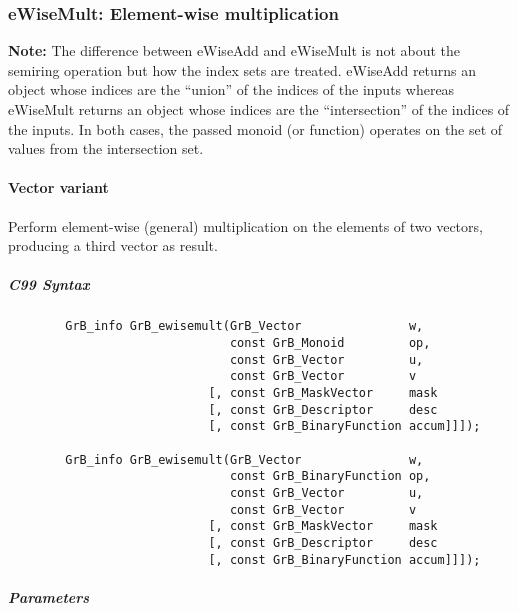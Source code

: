 \subsubsection{{\sf eWiseMult}: Element-wise multiplication}

{\bf Note:} The difference between {\sf eWiseAdd} and {\sf eWiseMult} is not 
about the semiring operation but how the index sets are treated.
{\sf eWiseAdd} returns an object whose indices are the ``union'' of the 
indices of the inputs whereas {\sf eWiseMult} returns an object whose indices 
are the ``intersection'' of the indices of the inputs. In both cases, the 
passed monoid (or function) operates on the set of values from the 
intersection set. 
 
\paragraph{Vector variant}

Perform element-wise (general) multiplication on the elements of two vectors,
producing a third vector as result.

\subparagraph{C99 Syntax}

\begin{verbatim}
        GrB_info GrB_ewisemult(GrB_Vector               w,
                               const GrB_Monoid         op, 
                               const GrB_Vector         u,
                               const GrB_Vector         v
                            [, const GrB_MaskVector     mask
                            [, const GrB_Descriptor     desc
                            [, const GrB_BinaryFunction accum]]]);
                            
        GrB_info GrB_ewisemult(GrB_Vector               w,
                               const GrB_BinaryFunction op, 
                               const GrB_Vector         u,
                               const GrB_Vector         v
                            [, const GrB_MaskVector     mask
                            [, const GrB_Descriptor     desc
                            [, const GrB_BinaryFunction accum]]]);
\end{verbatim}

\subparagraph{Parameters}

